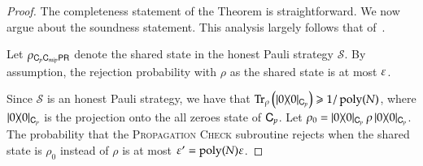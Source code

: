 \begin{proof}
	The completeness statement of the Theorem is straightforward. We now argue about the soundness statement. This analysis largely follows that of~\cite{ji2016compression}. 
	
	Let $\rho_{{\mathsf{C}}_p {\mathsf{C}}_{mip} {\mathsf{P}} {\mathsf{R}}}$ denote the shared state in the honest Pauli strategy $\mathcal{S}$. By assumption, the rejection probability with $\rho$ as the shared state is at most $\varepsilon$. %
	
	Since $\mathcal{S}$ is an honest Pauli strategy, we have that $\operatorname{Tr}_\rho \left ( |0\rangle\! \langle 0|_{{\mathsf{C}}_p}  \right) \geqslant 1/\operatorname{poly}(N)$, where $|0\rangle\! \langle 0|_{{\mathsf{C}}_p}$ is the projection onto the all zeroes state of ${\mathsf{C}}_p$. Let $\rho_0 = |0\rangle\! \langle 0|_{{\mathsf{C}}_p} \, \rho \, |0\rangle\! \langle 0|_{{\mathsf{C}}_p}$. The probability that the \textsc{Propagation Check} subroutine rejects when the shared state is $\rho_0$ instead of $\rho$ is at most $\varepsilon' = \operatorname{poly}(N) \varepsilon$. 
	

\end{proof}
